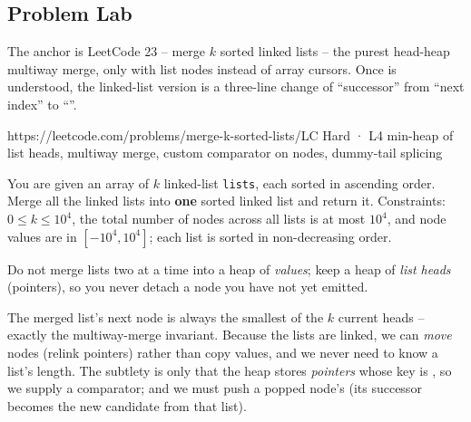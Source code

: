 \subsection{Problem Lab}

The anchor is LeetCode 23 -- merge $k$ sorted linked lists -- the purest head-heap multiway merge, only with
list nodes instead of array cursors. Once  is understood, the linked-list version is a
three-line change of ``successor'' from ``next index'' to ``''.

  {https://leetcode.com/problems/merge-k-sorted-lists/}{LC Hard · L4}
  {min-heap of list heads, multiway merge, custom comparator on nodes, dummy-tail splicing}

\begin{problemstatement}
You are given an array of $k$ linked-list \texttt{lists}, each sorted in ascending order. Merge all the
linked lists into \textbf{one} sorted linked list and return it. Constraints: $0 \le k \le 10^{4}$, the total
number of nodes across all lists is at most $10^{4}$, and node values are in $[-10^{4}, 10^{4}]$; each list
is sorted in non-decreasing order.
\end{problemstatement}

\begin{attemptgate}
Do not merge lists two at a time into a heap of \emph{values}; keep a heap of \emph{list heads} (pointers), so
you never detach a node you have not yet emitted.
\end{attemptgate}

The merged list's next node is always the smallest of the $k$ current heads -- exactly the multiway-merge
invariant. Because the lists are linked, we can \emph{move} nodes (relink  pointers) rather than
copy values, and we never need to know a list's length. The subtlety is only that the heap stores
\emph{pointers} whose key is , so we supply a comparator; and we must push a popped node's
 (its successor becomes the new candidate from that list).

